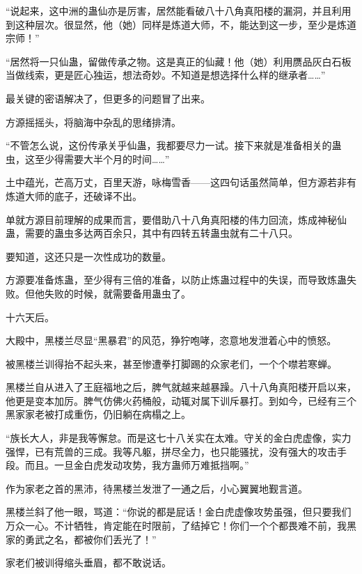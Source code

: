 
\begin{this_body}



“说起来，这中洲的蛊仙亦是厉害，居然能看破八十八角真阳楼的漏洞，并且利用到这种层次。很显然，他（她）同样是炼道大师，不，能达到这一步，至少是炼道宗师！”

“居然将一只仙蛊，留做传承之物。这是真正的仙藏！他（她）利用赝品灰白石板当做线索，更是匠心独运，想法奇妙。不知道是想选择什么样的继承者……”

最关键的密语解决了，但更多的问题冒了出来。

方源摇摇头，将脑海中杂乱的思绪排清。

“不管怎么说，这份传承关乎仙蛊，我都要尽力一试。接下来就是准备相关的蛊虫，这至少得需要大半个月的时间……”

土中蕴光，芒高万丈，百里天游，咏梅雪香——这四句话虽然简单，但方源若非有炼道大师的底子，还破译不出。

单就方源目前理解的成果而言，要借助八十八角真阳楼的伟力回流，炼成神秘仙蛊，需要的蛊虫多达两百余只，其中有四转五转蛊虫就有二十八只。

要知道，这还只是一次性成功的数量。

方源要准备炼蛊，至少得有三倍的准备，以防止炼蛊过程中的失误，而导致炼蛊失败。但他失败的时候，就需要备用蛊虫了。

十六天后。

大殿中，黑楼兰尽显“黑暴君”的风范，狰狞咆哮，恣意地发泄着心中的愤怒。

被黑楼兰训得抬不起头来，甚至惨遭拳打脚踢的众家老们，一个个噤若寒蝉。

黑楼兰自从进入了王庭福地之后，脾气就越来越暴躁。八十八角真阳楼开启以来，他更是变本加厉。脾气仿佛火药桶般，动辄对属下训斥暴打。到如今，已经有三个黑家家老被打成重伤，仍旧躺在病榻之上。

“族长大人，非是我等懈怠。而是这七十八关实在太难。守关的金白虎虚像，实力强悍，已有荒兽的三成。我等凡躯，拼尽全力，也只能骚扰，没有强大的攻击手段。而且。一旦金白虎发动攻势，我方蛊师万难抵挡啊。”

作为家老之首的黑沛，待黑楼兰发泄了一通之后，小心翼翼地觐言道。

黑楼兰斜了他一眼，骂道：“你说的都是屁话！金白虎虚像攻势虽强，但只要我们万众一心。不计牺牲，肯定能在时限前，了结掉它！你们一个个都畏难不前，我黑家的勇武之名，都被你们丢光了！”

家老们被训得缩头垂眉，都不敢说话。


\end{this_body}
